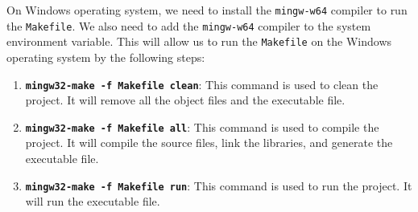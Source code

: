 \hspace{1cm} On Windows operating system, we need to install the \texttt{mingw-w64} compiler to run the \texttt{Makefile}. We also need to add the \texttt{mingw-w64} compiler to the system environment variable. This will allow us to run the \texttt{Makefile} on the Windows operating system by the following steps:
\begin{enumerate}
    \item \textbf{\texttt{mingw32-make -f Makefile clean}}: This command is used to clean the project. It will remove all the object files and the executable file.
    \item \textbf{\texttt{mingw32-make -f Makefile all}}: This command is used to compile the project. It will compile the source files, link the libraries, and generate the executable file.
    \item \textbf{\texttt{mingw32-make -f Makefile run}}: This command is used to run the project. It will run the executable file.
\end{enumerate}

